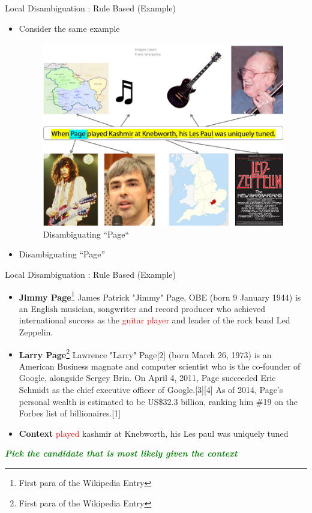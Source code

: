 \begin{frame}{Local Disambiguation : Rule Based (Example)}
\begin{itemize}
\item Consider the same example
 \begin{figure}[h]
 \centering
 \includegraphics[bb=0 0 216 165]{./nedrulebased.png}
 \caption{Disambiguating ``Page``}
\end{figure}
\item Disambiguating ``Page''
\end{itemize}
\end{frame}
\begin{frame}{Local Disambiguation : Rule Based (Example)}
 \begin{itemize}
  \item \textbf{Jimmy Page}\footnote{First para of the Wikipedia Entry} James Patrick "Jimmy" Page, OBE (born 9 January 1944) is an English musician, songwriter and record producer who achieved international success as the \textcolor{red}{guitar player} and leader of the rock band Led Zeppelin.
  \item \textbf{Larry Page}\footnote{First para of the Wikipedia Entry}	 Lawrence "Larry" Page[2] (born March 26, 1973) is an American Business magnate and computer scientist who is the co-founder of Google, alongside Sergey Brin. On April 4, 2011, Page succeeded Eric Schmidt as the chief executive officer of Google.[3][4] As of 2014, Page's personal wealth is estimated to be US\$32.3 billion, ranking him \#19 on the Forbes list of billionaires.[1]
  \item \textbf{Context} \textcolor{red}{played} kashmir at Knebworth, his Les paul was uniquely tuned
  
 \end{itemize}
\textcolor{green}{\textbf{\emph{Pick the candidate that is most likely given the context}}}
\end{frame}
